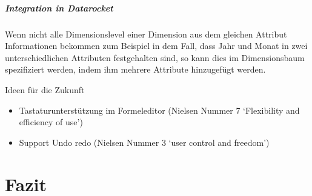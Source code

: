 \documentclass[
  language=german, %
  type=bachelor%
]{isthesis}
\begin{document}
\begin{content}
 \paragraph{Integration in \textit{Datarocket}}
 Wenn nicht alle Dimensionslevel einer Dimension aus dem gleichen Attribut
 Informationen bekommen zum Beispiel in dem Fall, dass Jahr und Monat in zwei
 unterschiedlichen Attributen festgehalten sind, so kann dies im Dimensionsbaum
 spezifiziert werden, indem ihm mehrere Attribute hinzugefügt werden.

  \begin{figure}[caption={\textit{DataRockets} \textit{Datapipeline}-Bausteine}, label={}]
  \end{figure}

	Ideen für die Zukunft
	\begin{itemize}
    \item Tastaturunterstützung im Formeleditor (Nielsen Nummer 7 `Flexibility
      and efficiency of use')
    \item Support Undo redo (Nielsen Nummer 3 `user control and freedom')
	\end{itemize}

\chapter{Fazit}



  

\end{content}
\end{document}
